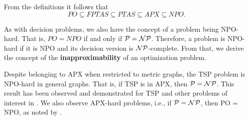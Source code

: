 From the definitions it follows that $$PO \subseteq FPTAS \subseteq PTAS \subseteq APX \subseteq NPO.$$

As with decision problems, we also have the concept of a problem being NPO-hard. That is, \(PO = NPO\) if and only if \(\mathcal{P} = \mathcal{NP}\). Therefore, a problem is NPO-hard if it is NPO and its decision version is \(\mathcal{NP}\)-complete. From that, we derive the concept of the \textbf{inapproximability} of an optimization problem.

Despite belonging to APX when restricted to metric graphs, the TSP problem is NPO-hard in general graphs. That is, if TSP is in APX, then \(\mathcal{P} = \mathcal{NP}\). This result has been observed and demonstrated for TSP and other problems of interest in \cite{NPOcompleteApproxProblems}.
We also observe APX-hard problems, i.e., if \(\mathcal{P} = \mathcal{NP}\), then PO = NPO, as noted by \cite{ComplexityApproximation}.
